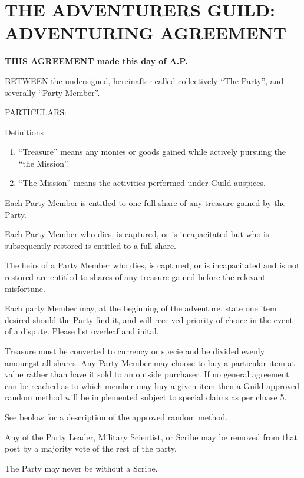 \section*{THE ADVENTURERS GUILD: ADVENTURING AGREEMENT}

\fontsize{8}{9pt}\selectfont

{\bfseries
THIS AGREEMENT made \hspace{15em} this day of  \hspace{15em}  A.P.

BETWEEN the undersigned, hereinafter called collectively ``The Party'', and severally ``Party Member''.

PARTICULARS:}

\begin{enumerate}
\item
Definitions
\begin{enumerate}
\item
``Treasure'' means any monies or goods gained while actively pursuing the ``the Mission''.
\item
``The Mission'' means the activities performed under Guild auspices.
\end{enumerate}

\item
Each Party Member is entitled to one full share of any treasure gained
by the Party.

\item
Each Party Member who dies, is captured, or is incapacitated but who
is subsequently restored is entitled to a full share.

\item
The heirs of a Party Member who dies, is captured, or is incapacitated
and is not restored are entitled to shares of any treasure gained
before the relevant misfortune.

\item
Each party Member may, at the beginning of the adventure, state one
item desired should the Party find it, and will received priority of
choice in the event of a dispute. {\tiny Please list overleaf and
inital}.

\item
Treasure must be converted to currency or specie and be divided evenly
amoungst all shares.  Any Party Member may choose to buy a particular
item at value rather than have it sold to an outside purchaser.  If no
general agreement can be reached as to which member may buy a given
item then a Guild approved random method will be implemented subject
to special claims as per cluase 5. {\item See beolow for a description
of the approved random method.}

\item
Any of the Party Leader, Military Scientist, or Scribe may be removed
from that post by a majority vote of the rest of the party.

\item
The Party may never be without a Scribe.
\end{enumerate}

